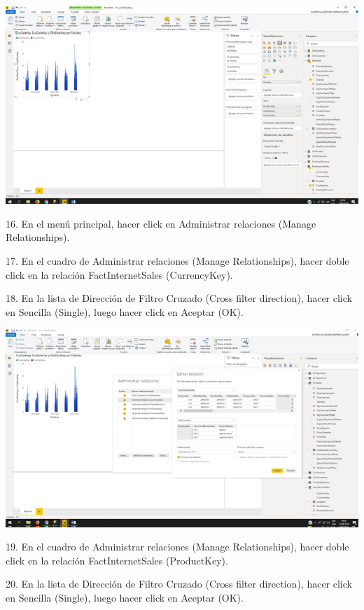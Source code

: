 \begin{center}
\includegraphics[width=15cm]{./Imagenes/img09} 
\end{center}
\item 16. En el menú principal, hacer click en Administrar relaciones (Manage Relationships).
\item 17. En el cuadro de Administrar relaciones (Manage Relationships), hacer doble click en la relación
FactInternetSales (CurrencyKey).
\item 18. En la lista de Dirección de Filtro Cruzado (Cross filter direction), hacer click en Sencilla (Single), luego hacer click en Aceptar (OK).
\begin{center}
\includegraphics[width=15cm]{./Imagenes/img10} 
\end{center}
\item 19. En el cuadro de Administrar relaciones (Manage Relationships), hacer doble click en la relación
FactInternetSales (ProductKey).
\item 20. En la lista de Dirección de Filtro Cruzado (Cross filter direction), hacer click en Sencilla (Single), luego hacer click en Aceptar (OK). 

